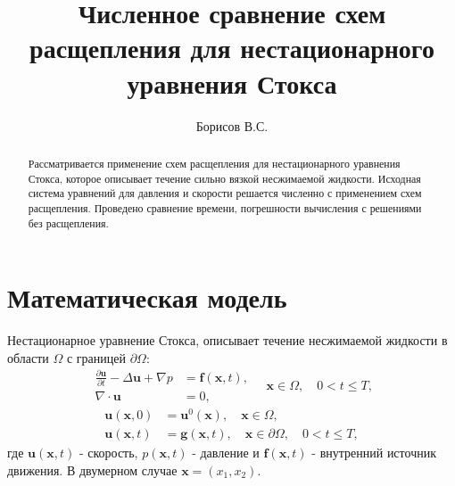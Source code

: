 \documentclass[12pt]{article}
\title{Численное сравнение схем расщепления для нестационарного уравнения Стокса}
\author{Борисов В.С.}
\begin{document}
\maketitle

\begin{abstract}
Рассматривается применение схем расщепления для нестационарного уравнения Стокса, которое описывает течение сильно вязкой несжимаемой жидкости. 
Исходная система уравнений для давления и скорости решается численно с применением схем расщепления. 
Проведено сравнение времени, погрешности вычисления с решениями без расщепления.
\end{abstract}

\section{Математическая модель}
Нестационарное уравнение Стокса, описывает течение несжимаемой жидкости в области $\Omega$ с границей $\partial \Omega$:
\begin{equation*}
\begin{aligned}
\frac{\partial {\bm u}}{\partial t} -\Delta {\bm u} + \nabla p &= {\bm f}({\bm x}, t), \\
\nabla\cdot{\bm u} &= 0, 
\end{aligned}
\quad {\bm x} \in \Omega, \quad 0<t \leq T,
\end{equation*} 
$$
\begin{aligned}
{\bm u({\bm x}, 0)} &= {\bm u^0}({\bm x}), \quad {\bm x} \in \Omega, \\
{\bm u({\bm x}, t)} &= {\bm g}({\bm x}, t), \quad {\bm x} \in \partial\Omega, \quad 0<t \leq T,
\end{aligned}
$$
где ${\bm u}({\bm x}, t)$ - скорость, $p({\bm x}, t)$ - давление и ${\bm f}({\bm x}, t)$ - внутренний источник движения. В двумерном случае ${\bm x}=(x_1, x_2)$.
\end{document}
